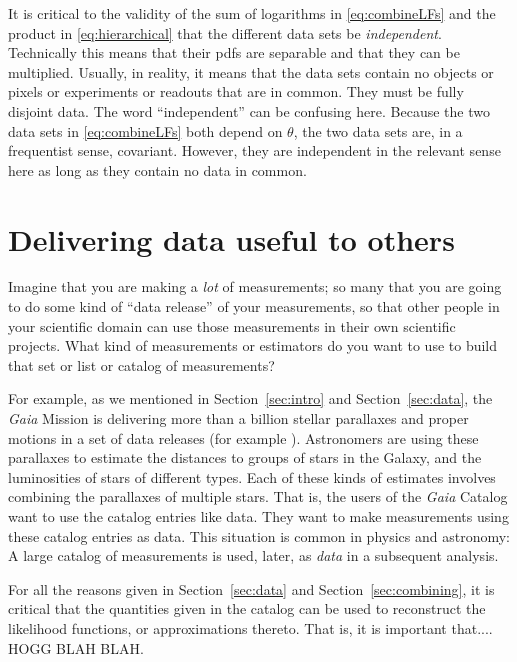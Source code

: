 \documentclass{article}
\newcommand{\sectionname}{Section}
\newcommand{\secref}[1]{\sectionname~\ref{#1}}
\begin{document}
It is critical to the validity of the sum of logarithms in \eqref{eq:combineLFs} and the product in \eqref{eq:hierarchical}
that the different data sets be \emph{independent}.
Technically this means that their pdfs are separable and that they can be multiplied.
Usually, in reality, it means that the data sets contain no objects or pixels or experiments or readouts that are in common.
They must be fully disjoint data.
The word ``independent'' can be confusing here.
Because the two data sets in \eqref{eq:combineLFs} both depend on $\theta$, the two data sets are, in a frequentist sense, covariant.
However, they are independent in the relevant sense here as long as they contain no data in common.

\section{Delivering data useful to others}\label{sec:catalogs}
Imagine that you are making a \emph{lot} of measurements; so many that you are going to do some kind of ``data release'' of your measurements, so that other people in your scientific domain can use those measurements in their own scientific projects.
What kind of measurements or estimators do you want to use to build that set or list or catalog of measurements?

For example, as we mentioned in \secref{sec:intro} and \secref{sec:data}, the \textsl{Gaia} Mission \cite{gaia} is delivering more than a billion stellar parallaxes and proper motions in a set of data releases (for example \cite{gaiadr3}).
Astronomers are using these parallaxes to estimate the distances to groups of stars in the Galaxy, and the luminosities of stars of different types.
Each of these kinds of estimates involves combining the parallaxes of multiple stars.
That is, the users of the \textsl{Gaia} Catalog want to use the catalog entries like data.
They want to make measurements using these catalog entries as data.
This situation is common in physics and astronomy:
A large catalog of measurements is used, later, as \emph{data} in a subsequent analysis.

For all the reasons given in \secref{sec:data} and \secref{sec:combining}, it is critical that the quantities given in the catalog can be used to reconstruct the likelihood functions, or approximations thereto.
That is, it is important that....
HOGG BLAH BLAH.
\end{document}
